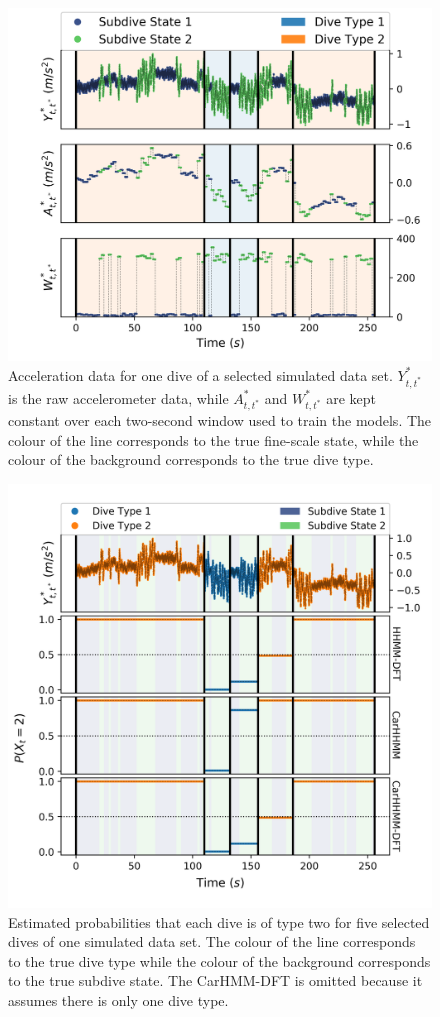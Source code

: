 \begin{figure}[ht]
	\centering
	\includegraphics[width=5in]{../Plots/sim_data.png}
	\caption{Acceleration data for one dive of a selected simulated data set. $Y^*_{t,t^*}$ is the raw accelerometer data, while $A^*_{t,t^*}$ and $W^*_{t,t^*}$ are kept constant over each two-second window used to train the models. The colour of the line corresponds to the true fine-scale state, while the colour of the background corresponds to the true dive type.}
	\label{fig:sim_data}
\end{figure}

\begin{figure}[ht]
    \centering
    \includegraphics[width=4.5in]{../Plots/Posterior_Coarse_States.png}
    \caption{Estimated probabilities that each dive is of type two for five selected dives of one simulated data set. The colour of the line corresponds to the true dive type while the colour of the background corresponds to the true subdive state. The CarHMM-DFT is omitted because it assumes there is only one dive type.}
    \label{fig:acc_coarse}
\end{figure}

